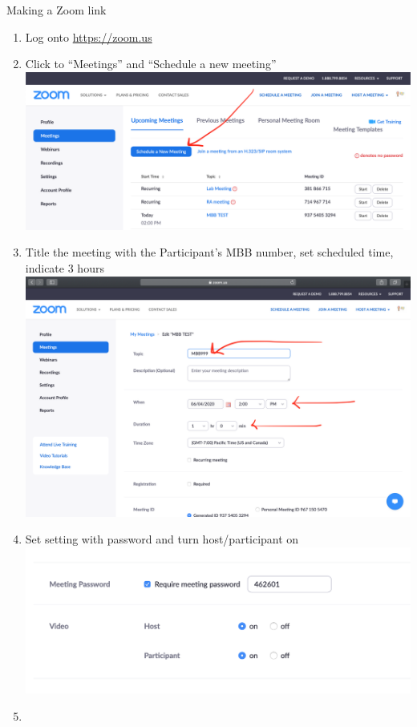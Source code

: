 \documentclass[]{book}
\providecommand{\tightlist}{%
  \setlength{\itemsep}{0pt}\setlength{\parskip}{0pt}}
\begin{document}
Making a Zoom link

\begin{enumerate}
\def\labelenumi{\arabic{enumi}.}
\tightlist
\item
  Log onto \url{https://zoom.us}
\item
  Click to ``Meetings'' and ``Schedule a new meeting'' \includegraphics{images/zoom_link/1.png}
\item
  Title the meeting with the Participant's MBB number, set scheduled time, indicate 3 hours \includegraphics{images/zoom_link/2.png}
\item
  Set setting with password and turn host/participant on \includegraphics{images/zoom_link/3.png}
\item

\end{enumerate}
\end{document}
